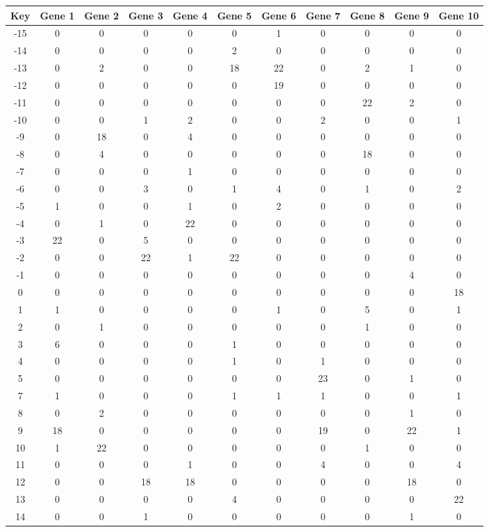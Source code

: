 \begin{tabular}{|c|c|c|c|c|c|c|c|c|c|c|}
\hline
Key & Gene 1 & Gene 2 & Gene 3 & Gene 4 & Gene 5 & Gene 6 & Gene 7 & Gene 8 & Gene 9 & Gene 10 \\
\hline
-15 & 0 & 0 & 0 & 0 & 0 & 1 & 0 & 0 & 0 & 0 \\
-14 & 0 & 0 & 0 & 0 & 2 & 0 & 0 & 0 & 0 & 0 \\
-13 & 0 & 2 & 0 & 0 & 18 & 22 & 0 & 2 & 1 & 0 \\
-12 & 0 & 0 & 0 & 0 & 0 & 19 & 0 & 0 & 0 & 0 \\
-11 & 0 & 0 & 0 & 0 & 0 & 0 & 0 & 22 & 2 & 0 \\
-10 & 0 & 0 & 1 & 2 & 0 & 0 & 2 & 0 & 0 & 1 \\
-9 & 0 & 18 & 0 & 4 & 0 & 0 & 0 & 0 & 0 & 0 \\
-8 & 0 & 4 & 0 & 0 & 0 & 0 & 0 & 18 & 0 & 0 \\
-7 & 0 & 0 & 0 & 1 & 0 & 0 & 0 & 0 & 0 & 0 \\
-6 & 0 & 0 & 3 & 0 & 1 & 4 & 0 & 1 & 0 & 2 \\
-5 & 1 & 0 & 0 & 1 & 0 & 2 & 0 & 0 & 0 & 0 \\
-4 & 0 & 1 & 0 & 22 & 0 & 0 & 0 & 0 & 0 & 0 \\
-3 & 22 & 0 & 5 & 0 & 0 & 0 & 0 & 0 & 0 & 0 \\
-2 & 0 & 0 & 22 & 1 & 22 & 0 & 0 & 0 & 0 & 0 \\
-1 & 0 & 0 & 0 & 0 & 0 & 0 & 0 & 0 & 4 & 0 \\
0 & 0 & 0 & 0 & 0 & 0 & 0 & 0 & 0 & 0 & 18 \\
1 & 1 & 0 & 0 & 0 & 0 & 1 & 0 & 5 & 0 & 1 \\
2 & 0 & 1 & 0 & 0 & 0 & 0 & 0 & 1 & 0 & 0 \\
3 & 6 & 0 & 0 & 0 & 1 & 0 & 0 & 0 & 0 & 0 \\
4 & 0 & 0 & 0 & 0 & 1 & 0 & 1 & 0 & 0 & 0 \\
5 & 0 & 0 & 0 & 0 & 0 & 0 & 23 & 0 & 1 & 0 \\
7 & 1 & 0 & 0 & 0 & 1 & 1 & 1 & 0 & 0 & 1 \\
8 & 0 & 2 & 0 & 0 & 0 & 0 & 0 & 0 & 1 & 0 \\
9 & 18 & 0 & 0 & 0 & 0 & 0 & 19 & 0 & 22 & 1 \\
10 & 1 & 22 & 0 & 0 & 0 & 0 & 0 & 1 & 0 & 0 \\
11 & 0 & 0 & 0 & 1 & 0 & 0 & 4 & 0 & 0 & 4 \\
12 & 0 & 0 & 18 & 18 & 0 & 0 & 0 & 0 & 18 & 0 \\
13 & 0 & 0 & 0 & 0 & 4 & 0 & 0 & 0 & 0 & 22 \\
14 & 0 & 0 & 1 & 0 & 0 & 0 & 0 & 0 & 1 & 0 \\
\hline
\end{tabular}